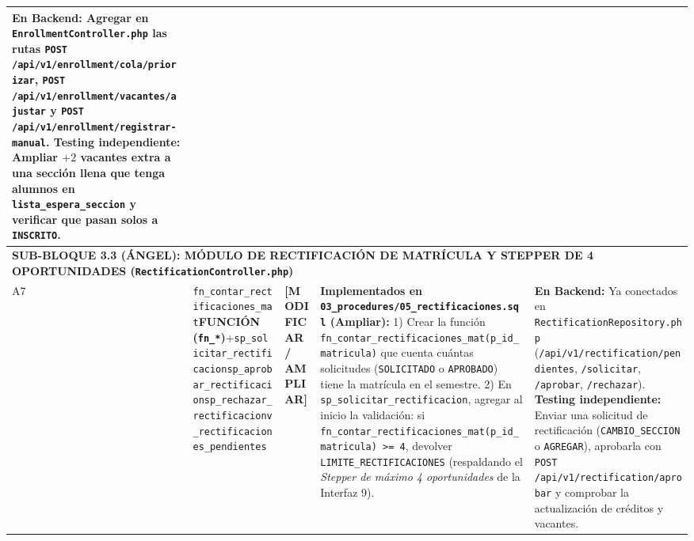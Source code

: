 \documentclass[10pt,a4paper,landscape]{article}
\newcommand{\stModif}{\textbf{\textcolor{orange!85!black}{[MODIFICAR / AMPLIAR]}}}
\newcommand{\objFunc}{\textbf{\textcolor{teal!80!black}{FUNCIÓN (\texttt{fn\_*})}}}
\begin{document}
\begin{longtable}{|p{0.5cm}|p{3.8cm}|p{2.9cm}|p{8.8cm}|p{9.2cm}|}
\textbf{En Backend:} Agregar en \texttt{EnrollmentController.php} las rutas \texttt{POST /api/v1/enrollment/cola/priorizar}, \texttt{POST /api/v1/enrollment/vacantes/ajustar} y \texttt{POST /api/v1/enrollment/registrar-manual}.\newline
\textbf{Testing independiente:} Ampliar $+2$ vacantes extra a una sección llena que tenga alumnos en \texttt{lista\_espera\_seccion} y verificar que pasan solos a \texttt{INSCRITO}. \\
\hline

\multicolumn{5}{|l|}{\cellcolor{angelHeader}\textbf{\textcolor{unjbgNavy}{SUB-BLOQUE 3.3 (ÁNGEL): MÓDULO DE RECTIFICACIÓN DE MATRÍCULA Y STEPPER DE 4 OPORTUNIDADES (\texttt{RectificationController.php})}}} \\
\hline

A7 & \texttt{fn\_contar\_rectificaciones\_mat}\newline \objFunc\newline +\newline \texttt{sp\_solicitar\_rectificacion}\newline \texttt{sp\_aprobar\_rectificacion}\newline \texttt{sp\_rechazar\_rectificacion}\newline \texttt{v\_rectificaciones\_pendientes} & \stModif & 
\textbf{Implementados en \texttt{03\_procedures/05\_rectificaciones.sql} (Ampliar):}
1) Crear la función \texttt{fn\_contar\_rectificaciones\_mat(p\_id\_matricula)} que cuenta cuántas solicitudes (\texttt{SOLICITADO} o \texttt{APROBADO}) tiene la matrícula en el semestre.
2) En \texttt{sp\_solicitar\_rectificacion}, agregar al inicio la validación: si \texttt{fn\_contar\_rectificaciones\_mat(p\_id\_matricula) >= 4}, devolver \texttt{LIMITE\_RECTIFICACIONES} (respaldando el \textit{Stepper de máximo 4 oportunidades} de la Interfaz 9). & 
\textbf{En Backend:} Ya conectados en \texttt{RectificationRepository.php} (\texttt{/api/v1/rectification/pendientes}, \texttt{/solicitar}, \texttt{/aprobar}, \texttt{/rechazar}).\newline
\textbf{Testing independiente:} Enviar una solicitud de rectificación (\texttt{CAMBIO\_SECCION} o \texttt{AGREGAR}), aprobarla con \texttt{POST /api/v1/rectification/aprobar} y comprobar la actualización de créditos y vacantes. \\
\hline

\end{longtable}
\normalsize
\end{document}
